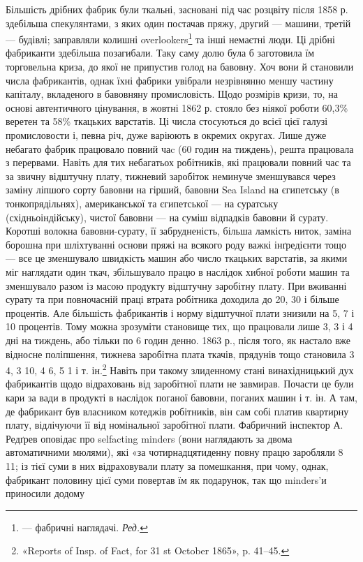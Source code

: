 \parcont{}  %
Більшість дрібних фабрик були ткальні, засновані під час розцвіту
після 1858 р. здебільша спекулянтами, з яких один постачав
пряжу, другий — машини, третій — будівлі; заправляли колишні
overlookers\footnote*{
— фабричні наглядачі. \emph{Ред.}
} та інші немаєтні люди. Ці дрібні фабриканти здебільша
позагибали. Таку саму долю була б заготовила їм торговельна
криза, до якої не припустив голод на бавовну. Хоч вони
й становили  числа фабрикантів, однак їхні фабрики увібрали
незрівнянно меншу частину капіталу, вкладеного в бавовняну промисловість.
Щодо розмірів кризи, то, на основі автентичного
цінування, в жовтні 1862 р. стояло без ніякої роботи 60,3\%
веретен та 58\% ткацьких варстатів. Ці числа стосуються до всієї
цієї галузі промисловости і, певна річ, дуже варіюють в окремих
округах. Лише дуже небагато фабрик працювало повний чаc (60 годин на тиждень),
решта працювала з перервами. Навіть
для тих небагатьох робітників, які працювали повний час
та за звичну відштучну плату, тижневий заробіток неминуче зменшувався
через заміну ліпшого сорту бавовни на гірший, бавовни
Sea Island на єгипетську (в тонкопрядільнях), американської та
єгипетської — на суратську (східньоіндійську), чистої бавовни —
на суміш відпадків бавовни й сурату. Коротші волокна бавовни-сурату,
її забрудненість, більша ламкість ниток, заміна борошна
при шліхтуванні основи пряжі на всякого роду важкі інґредієнти
тощо — все це зменшувало швидкість машин або число ткацьких
варстатів, за якими міг наглядати один ткач, збільшувало працю
в наслідок хибної роботи машин та зменшувало разом із масою
продукту відштучну заробітну плату. При вживанні сурату та
при повночасній праці втрата робітника доходила до 20, 30 і
більше процентів. Але більшість фабрикантів і норму відштучної
плати знизили на 5, 7 і 10 процентів. Тому можна зрозуміти
становище тих, що працювали лише 3, 3 і 4 дні на тиждень,
або тільки по 6 годин денно. 1863 р., після того, як настало вже
відносне поліпшення, тижнева заробітна плата ткачів, прядунів
тощо становила 3 4, 3 10, 4
6, 5 1 і т. ін.\footnote{
«Reports of Insp. of Fact, for 31 st October 1865», p. 41--45.
} Навіть при такому злиденному
стані винахідницький дух фабрикантів щодо відраховань
від заробітної плати не завмирав. Почасти це були кари за вади
в продукті в наслідок поганої бавовни, поганих машин і т. ін.
А там, де фабрикант був власником котеджів робітників, він сам
собі платив квартирну плату, відлічуючи її від номінальної
заробітної плати. Фабричний інспектор А. Редґрев оповідає
про selfacting minders (вони наглядають за двома автоматичними
мюлями), які «за чотирнадцятиденну повну працю заробляли
8 11; із тієї суми в них відраховували плату за
помешкання, при чому, однак, фабрикант половину цієї суми
повертав їм як подарунок, так що minders’и приносили додому
\parbreak{}  %
